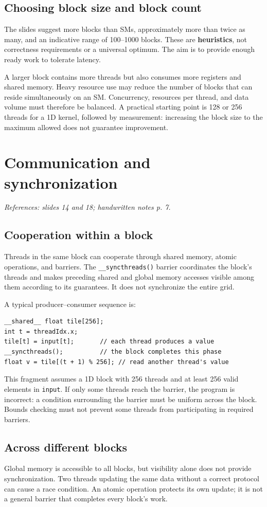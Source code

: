 \documentclass[11pt,a4paper]{article}
\let\originalsection\section
\renewcommand{\section}{\Needspace{7\baselineskip}\originalsection}
\let\originalsubsection\subsection
\renewcommand{\subsection}{\Needspace{5\baselineskip}\originalsubsection}
\newcommand{\src}[1]{\par{\small\color{accent}\textit{References: #1.}}\par}
\begin{document}
\subsection{Choosing block size and block count}
The slides suggest more blocks than SMs, approximately more than twice
as many, and an indicative range of 100--1000 blocks. These are
\textbf{heuristics}, not correctness requirements or a universal optimum.
The aim is to provide enough ready work to tolerate latency.

A larger block contains more threads but also consumes more registers and
shared memory. Heavy resource use may reduce the number of blocks that can
reside simultaneously on an SM. Concurrency, resources per thread, and data
volume must therefore be balanced. A practical starting point is 128 or
256 threads for a 1D kernel, followed by measurement: increasing the block
size to the maximum allowed does not guarantee improvement.

\section{Communication and synchronization}
\src{slides 14 and 18; handwritten notes p. 7}
\subsection{Cooperation within a block}
Threads in the same block can cooperate through shared memory, atomic
operations, and barriers. The \texttt{\_\_syncthreads()} barrier coordinates
the block's threads and makes preceding shared and global memory accesses
visible among them according to its guarantees. It does not synchronize
the entire grid.

A typical producer--consumer sequence is:
\begin{lstlisting}
__shared__ float tile[256];
int t = threadIdx.x;
tile[t] = input[t];       // each thread produces a value
__syncthreads();          // the block completes this phase
float v = tile[(t + 1) % 256]; // read another thread's value
\end{lstlisting}
This fragment assumes a 1D block with 256 threads and at least 256 valid
elements in \texttt{input}. If only some threads reach the barrier, the
program is incorrect: a condition surrounding the barrier must be uniform
across the block. Bounds checking must not prevent some threads from
participating in required barriers.

\subsection{Across different blocks}
Global memory is accessible to all blocks, but visibility alone does not
provide synchronization. Two threads updating the same data without a
correct protocol can cause a race condition. An atomic operation protects
its own update; it is not a general barrier that completes every block's
work.
\end{document}
